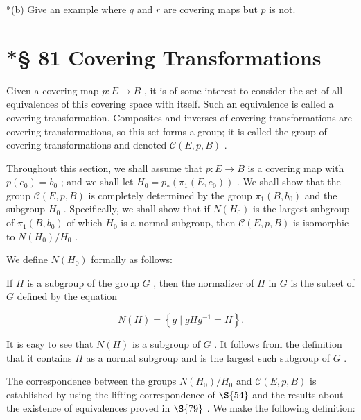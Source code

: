 *(b) Give an example where \(q\) and \(r\) are covering maps but \(p\) is not.

\section*{*§  81 Covering Transformations}

Given a covering map \(p : E \rightarrow  B\) , it is of some interest to consider the set of all equivalences of this covering space with itself. Such an equivalence is called a covering transformation. Composites and inverses of covering transformations are covering transformations, so this set forms a group; it is called the group of covering transformations and denoted \(\mathcal{C}\left( {E,p,B}\right)\) .

Throughout this section, we shall assume that \(p : E \rightarrow  B\) is a covering map with \(p\left( {e}_{0}\right)  = {b}_{0}\) ; and we shall let \({H}_{0} = {p}_{ * }\left( {{\pi }_{1}\left( {E,{e}_{0}}\right) }\right)\) . We shall show that the group \(\mathcal{C}\left( {E,p,B}\right)\) is completely determined by the group \({\pi }_{1}\left( {B,{b}_{0}}\right)\) and the subgroup \({H}_{0}\) . Specifically, we shall show that if \(N\left( {H}_{0}\right)\) is the largest subgroup of \({\pi }_{1}\left( {B,{b}_{0}}\right)\) of which \({H}_{0}\) is a normal subgroup, then \(\mathcal{C}\left( {E,p,B}\right)\) is isomorphic to \(N\left( {H}_{0}\right) /{H}_{0}\) .

We define \(N\left( {H}_{0}\right)\) formally as follows:

\begin{definition} If \(H\) is a subgroup of the group \(G\) , then the normalizer of \(H\) in \(G\) is the subset of \(G\) defined by the equation

\[
N\left( H\right)  = \left\{  {g \mid  {gH}{g}^{-1} = H}\right\}  .
\]
\end{definition}

It is easy to see that \(N\left( H\right)\) is a subgroup of \(G\) . It follows from the definition that it contains \(H\) as a normal subgroup and is the largest such subgroup of \(G\) .

The correspondence between the groups \(N\left( {H}_{0}\right) /{H}_{0}\) and \(\mathcal{C}\left( {E,p,B}\right)\) is established by using the lifting correspondence of \( \S {54}\) and the results about the existence of equivalences proved in \( \S {79}\) . We make the following definition:

